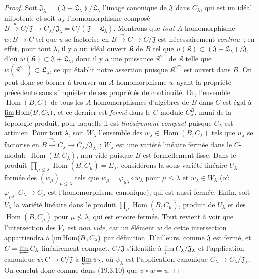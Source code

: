 \begin{proof}
Soit $\mathfrak J_\lambda=(\mathfrak J+\mathfrak L_\lambda)/\mathfrak L_\lambda$
l'image canonique de $\mathfrak J$ dans $C_\lambda$, qui est un idéal
nilpotent, et soit $u_\lambda$ l'homomorphisme composé
$B\xrightarrow{u}C/\mathfrak J\to C_\lambda/\mathfrak J_\lambda
=C/(\mathfrak J+\mathfrak L_\lambda)$. Montrons que \emph{tout}
$A$-homomorphisme $w:B\to C$ tel que $u$ se factorise en
$B\xrightarrow{w}C\to C/\mathfrak J$ est nécessairement \emph{continu}~; en
effet, pour tout $\lambda$, il y a un idéal ouvert $\mathfrak K$ de $B$
tel que $u(\mathfrak K)\subset
(\mathfrak J+\mathfrak L_\lambda)/\mathfrak J$, d'où
$w(\mathfrak K)\subset\mathfrak J+\mathfrak L_\lambda$, donc il y a
une puissance $\mathfrak K^{2^m}$ de $\mathfrak K$ telle que
$w(\mathfrak K^{2^m})\subset\mathfrak L_\lambda$, ce qui établit
notre assertion puisque $\mathfrak K^{2^m}$ est ouvert dans $B$. On peut
donc se borner à trouver un $A$-homomorphisme $w$ ayant la propriété précédente
sans s'inquiéter de ses propriétés de continuité. Or, l'ensemble
$\operatorname{Hom}(B,C)$ de tous les $A$-homomorphismes d'algèbres de $B$
dans $C$ est égal à
$\varprojlim\operatorname{Hom}(B,C_\lambda)$, et ce dernier est
\emph{fermé} dans le $C$-module $C_\lambda^B$, muni de la topologie
produit, pour laquelle il est \emph{linéairement compact} puisque
  $C_\lambda$ est artinien. Pour tout $\lambda$, soit $W_\lambda$
l'ensemble des $w_\lambda\in\operatorname{Hom}(B,C_\lambda)$ tels que
$u_\lambda$ se factorise en
$B\xrightarrow{w_\lambda}C_\lambda\to
C_\lambda/\mathfrak J_\lambda$~; $W_\lambda$ est une variété
linéaire fermée dans le $C$-module
  $\operatorname{Hom}(B,C_\lambda)$, non vide puisque $B$ est formellement
  lisse. Dans le produit
$\prod_{\mu\leq\lambda}\operatorname{Hom}(B,C_\mu)=E_\lambda$,
considérons la sous-variété linéaire $U_\lambda$ formée des
$(w_\mu)_{\mu\leq\lambda}$ tels que
$w_\mu=\varphi_{\mu\lambda}\circ w_\lambda$ pour
$\mu\leq\lambda$ et $w_\lambda\in W_\lambda$ (où
$\varphi_{\mu\lambda}:C_\lambda\to C_\mu$ est
l'homomorphisme canonique), qui est aussi fermée. Enfin, soit $V_\lambda$
la variété linéaire dans le produit
$\prod_\mu\operatorname{Hom}(B,C_\mu)$, produit de $U_\lambda$
et des $\operatorname{Hom}(B,C_\mu)$ pour
$\mu\not\leq\lambda$, qui est encore fermée. Tout revient à voir que
l'intersection des $V_\lambda$ est \emph{non vide}, car un élément $w$ de
cette intersection appartiendra à
$\varprojlim\operatorname{Hom}(B,C_\lambda)$ par définition.
D'ailleurs, comme $\mathfrak J$ est fermé, et
$C=\varprojlim C_\lambda$ linéairement compact,
$C/\mathfrak J$ s'identifie à
$\varprojlim C_\lambda/\mathfrak J_\lambda$ et
l'application canonique $\psi:C\to C/\mathfrak J$ à
$\varprojlim\psi_\lambda$, où $\psi_\lambda$ est
l'application canonique
$C_\lambda\to C_\lambda/\mathfrak J_\lambda$. On conclut donc
comme dans (19.3.10) que $\psi\circ w=u$.
\end{proof}

